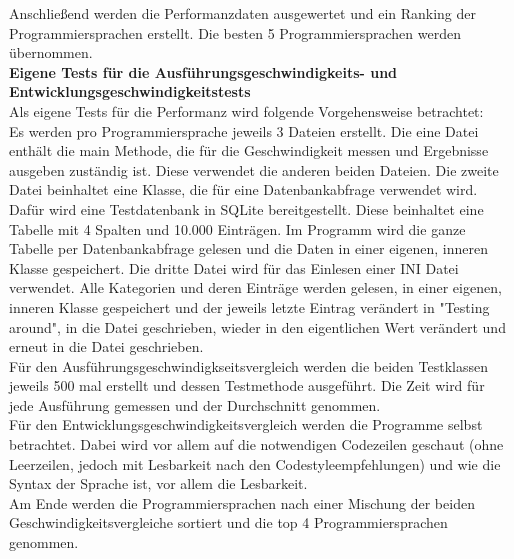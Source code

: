 \documentclass[ngerman]{article}
\begin{document}
    Anschließend werden die Performanzdaten ausgewertet und ein Ranking der Programmiersprachen erstellt. Die besten 5 Programmiersprachen werden übernommen.\\
    \textbf{Eigene Tests für die Ausführungsgeschwindigkeits- und Entwicklungsgeschwindigkeitstests}\\
    Als eigene Tests für die Performanz wird folgende Vorgehensweise betrachtet:\\
    Es werden pro Programmiersprache jeweils 3 Dateien erstellt. Die eine Datei enthält die main Methode, die für die Geschwindigkeit messen und Ergebnisse ausgeben zuständig ist. Diese verwendet die anderen beiden Dateien. Die zweite Datei beinhaltet eine Klasse, die für eine Datenbankabfrage verwendet wird. Dafür wird eine Testdatenbank in SQLite bereitgestellt. Diese beinhaltet eine Tabelle mit 4 Spalten und 10.000 Einträgen. Im Programm wird die ganze Tabelle per Datenbankabfrage gelesen und die Daten in einer eigenen, inneren Klasse gespeichert. Die dritte Datei wird für das Einlesen einer INI Datei verwendet. Alle Kategorien und deren Einträge werden gelesen, in einer eigenen, inneren Klasse gespeichert und der jeweils letzte Eintrag verändert in "Testing around", in die Datei geschrieben, wieder in den eigentlichen Wert verändert und erneut in die Datei geschrieben.\\
    Für den Ausführungsgeschwindigkseitsvergleich werden die beiden Testklassen jeweils 500 mal erstellt und dessen Testmethode ausgeführt. Die Zeit wird für jede Ausführung gemessen und der Durchschnitt genommen.\\
    Für den Entwicklungsgeschwindigkeitsvergleich werden die Programme selbst betrachtet. Dabei wird vor allem auf die notwendigen Codezeilen geschaut (ohne Leerzeilen, jedoch mit Lesbarkeit nach den Codestyleempfehlungen) und wie die Syntax der Sprache ist, vor allem die Lesbarkeit.\\
    Am Ende werden die Programmiersprachen nach einer Mischung der beiden Geschwindigkeitsvergleiche sortiert und die top 4 Programmiersprachen genommen.
\end{document}
